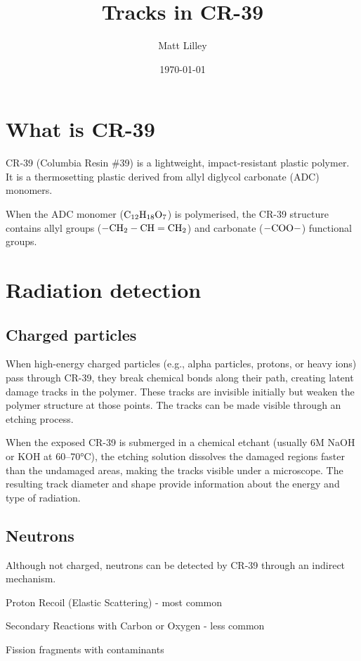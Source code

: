\documentclass[
]{article}
\title{Tracks in CR-39}
\author{Matt Lilley}
\date{\today}  %
\renewcommand{\[}{\begin{equation}}
\renewcommand{\]}{\end{equation}}
\begin{document}
\maketitle

\section{What is CR-39}\label{what-is-cr-39}

CR-39 (Columbia Resin \#39) is a lightweight, impact-resistant plastic
polymer. It is a thermosetting plastic derived from allyl diglycol
carbonate (ADC) monomers.

When the ADC monomer (\(\rm C_{12} H_{18} O_7\)) is polymerised, the
CR-39 structure contains allyl groups (\(\rm-CH_2-CH=CH_2\)) and
carbonate (\(\rm -COO-\)) functional groups.

\section{Radiation detection}\label{radiation-detection}

\subsection{Charged particles}\label{charged-particles}

When high-energy charged particles (e.g., alpha particles, protons, or
heavy ions) pass through CR-39, they break chemical bonds along their
path, creating latent damage tracks in the polymer. These tracks are
invisible initially but weaken the polymer structure at those points.
The tracks can be made visible through an etching process.

When the exposed CR-39 is submerged in a chemical etchant (usually 6M
NaOH or KOH at 60--70°C), the etching solution dissolves the damaged
regions faster than the undamaged areas, making the tracks visible under
a microscope. The resulting track diameter and shape provide information
about the energy and type of radiation.

\subsection{Neutrons}\label{neutrons}

Although not charged, neutrons can be detected by CR-39 through an
indirect mechanism.

Proton Recoil (Elastic Scattering) - most common

Secondary Reactions with Carbon or Oxygen - less common

Fission fragments with contaminants

\paragraph{}\label{section}

\printbibliography
\end{document}
